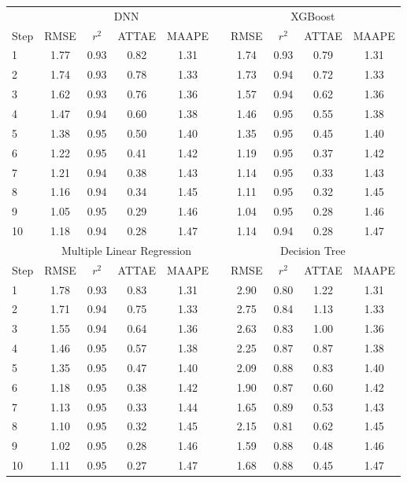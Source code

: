 \documentclass[]{interact}
\theoremstyle{plain}%
\theoremstyle{definition}
\theoremstyle{remark}
\begin{document}
\begin{table}[H]
{\begin{tabular}{lccccccccc} \toprule
  &  \multicolumn{4}{c}{DNN}  & \multicolumn{1}{c}{\quad} & \multicolumn{4}{c}{XGBoost} \\ \cmidrule{2-10}
 Step  &  RMSE  &  $r^2$  &  ATTAE & MAAPE & \quad &  RMSE  &  $r^2$  &  ATTAE & MAAPE \\ \midrule
1 & 1.77 & 0.93 & 0.82 & 1.31 & \quad & 1.74 & 0.93 & 0.79 & 1.31 \\
2 & 1.74 & 0.93 & 0.78 & 1.33 & \quad & 1.73 & 0.94 & 0.72 & 1.33 \\
3 & 1.62 & 0.93 & 0.76 & 1.36 & \quad & 1.57 & 0.94 & 0.62 & 1.36 \\
4 & 1.47 & 0.94 & 0.60 & 1.38 & \quad & 1.46 & 0.95 & 0.55 & 1.38 \\
5 & 1.38 & 0.95 & 0.50 & 1.40 & \quad & 1.35 & 0.95 & 0.45 & 1.40 \\
6 & 1.22 & 0.95 & 0.41 & 1.42 & \quad & 1.19 & 0.95 & 0.37 & 1.42 \\
7 & 1.21 & 0.94 & 0.38 & 1.43 & \quad & 1.14 & 0.95 & 0.33 & 1.43 \\
8 & 1.16 & 0.94 & 0.34 & 1.45 & \quad & 1.11 & 0.95 & 0.32 & 1.45 \\
9 & 1.05 & 0.95 & 0.29 & 1.46 & \quad & 1.04 & 0.95 & 0.28 & 1.46 \\
10 & 1.18 & 0.94 & 0.28 & 1.47 & \quad & 1.14 & 0.94 & 0.28 & 1.47 \\
\bottomrule
  &  \multicolumn{4}{c}{Multiple Linear Regression}  & \multicolumn{1}{c}{\quad} & \multicolumn{4}{c}{Decision Tree} \\ \cmidrule{2-10}
 Step  &  RMSE  &  $r^2$  &  ATTAE & MAAPE & \quad &  RMSE  &  $r^2$  &  ATTAE & MAAPE \\ \midrule
1 & 1.78 & 0.93 & 0.83 & 1.31 & \quad & 2.90 & 0.80 & 1.22 & 1.31 \\
2 & 1.71 & 0.94 & 0.75 & 1.33 & \quad & 2.75 & 0.84 & 1.13 & 1.33 \\
3 & 1.55 & 0.94 & 0.64 & 1.36 & \quad & 2.63 & 0.83 & 1.00 & 1.36 \\
4 & 1.46 & 0.95 & 0.57 & 1.38 & \quad & 2.25 & 0.87 & 0.87 & 1.38 \\
5 & 1.35 & 0.95 & 0.47 & 1.40 & \quad & 2.09 & 0.88 & 0.83 & 1.40 \\
6 & 1.18 & 0.95 & 0.38 & 1.42 & \quad & 1.90 & 0.87 & 0.60 & 1.42 \\
7 & 1.13 & 0.95 & 0.33 & 1.44 & \quad & 1.65 & 0.89 & 0.53 & 1.43 \\
8 & 1.10 & 0.95 & 0.32 & 1.45 & \quad & 2.15 & 0.81 & 0.62 & 1.45 \\
9 & 1.02 & 0.95 & 0.28 & 1.46 & \quad & 1.59 & 0.88 & 0.48 & 1.46 \\
10 & 1.11 & 0.95 & 0.27 & 1.47 & \quad & 1.68 & 0.88 & 0.45 & 1.47 \\
\bottomrule
\end{tabular}}
\label{table:TravelTimePrediction}
\end{table}
\end{document}
